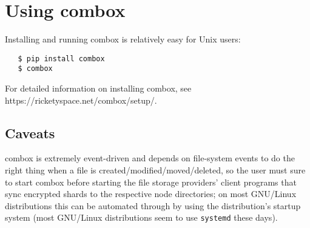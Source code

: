 \section{Using combox}\label{1-sec-using-cb}

Installing and running combox is relatively easy for Unix users:

\begin{verbatim}
   $ pip install combox
   $ combox
\end{verbatim}

For detailed information on installing combox, see
https://ricketyspace.net/combox/setup/.

\subsection{Caveats}

combox is extremely event-driven and depends on file-system events to
do the right thing when a file is created/modified/moved/deleted, so
the user must sure to start combox before starting the file storage
providers' client programs that sync encrypted shards to the
respective node directories; on most GNU/Linux distributions this can
be automated through by using the distribution's startup system (most
GNU/Linux distributions seem to use
\verb+systemd+\cite{website:systemd} these days).
